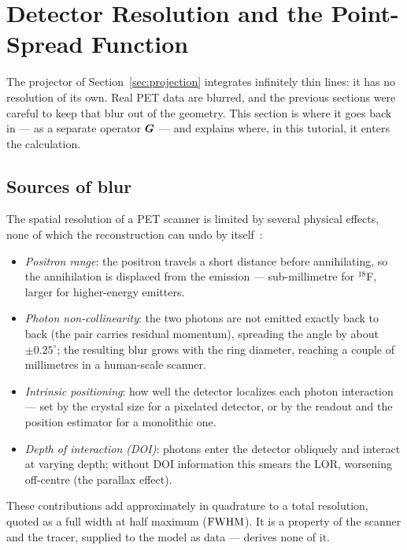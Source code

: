 \section{Detector Resolution and the Point-Spread Function}
\label{sec:resolution}

The projector of Section~\ref{sec:projection} integrates infinitely thin lines:
it has no resolution of its own. Real PET data are blurred, and the previous
sections were careful to keep that blur out of the geometry. This section is
where it goes back in --- as a separate operator $\bm{G}$ --- and explains where,
in this tutorial, it enters the calculation.

\subsection{Sources of blur}
\label{sec:resolution:sources}

The spatial resolution of a PET scanner is limited by several physical effects,
none of which the reconstruction can undo by itself~\cite{moses2011}:
\begin{itemize}
  \item \emph{Positron range}: the positron travels a short distance before
        annihilating, so the annihilation is displaced from the emission ---
        sub-millimetre for $^{18}$F, larger for higher-energy emitters.
  \item \emph{Photon non-collinearity}: the two photons are not emitted exactly
        back to back (the pair carries residual momentum), spreading the angle
        by about $\pm0.25^\circ$; the resulting blur grows with the ring
        diameter, reaching a couple of millimetres in a human-scale scanner.
  \item \emph{Intrinsic positioning}: how well the detector localizes each
        photon interaction --- set by the crystal size for a pixelated detector,
        or by the readout and the position estimator for a monolithic one.
  \item \emph{Depth of interaction (DOI)}: photons enter the detector
        obliquely and interact at varying depth; without DOI information this
        smears the LOR, worsening off-centre (the parallax effect).
\end{itemize}
These contributions add approximately in quadrature to a total resolution,
quoted as a full width at half maximum ($\mathrm{FWHM}$). It is a property of the
scanner and the tracer, supplied to the model as data --- 
derives none of it.

